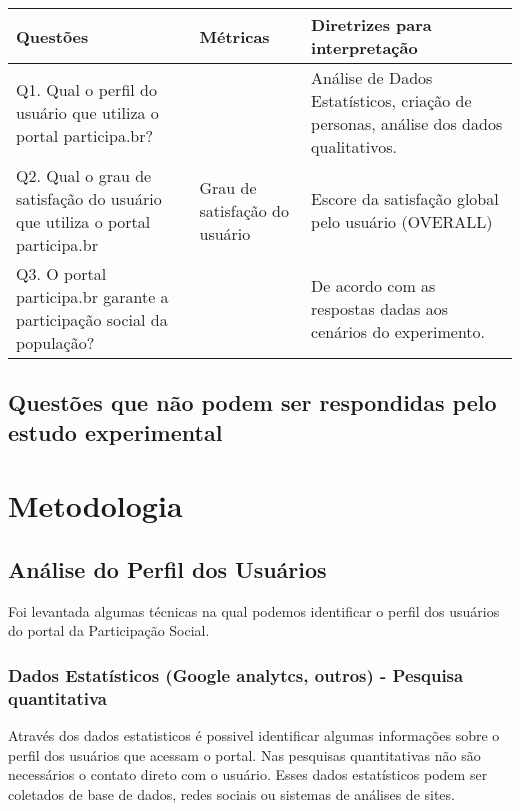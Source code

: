 \begin{table}[h]
\begin{tabular}{|l|l|l|}
\hline
\textbf{Questões}                                                          & Métricas                      & Diretrizes para interpretação                                                       \\ \hline
Q1. Qual o perfil do usuário que utiliza o portal participa.br?            &                               & Análise de Dados Estatísticos, criação de personas, análise dos dados qualitativos. \\ \hline
Q2. Qual o grau de satisfação do usuário que utiliza o portal participa.br & Grau de satisfação do usuário & Escore da satisfação global pelo usuário (OVERALL)                                  \\ \hline
Q3. O portal participa.br garante a participação social da população?      &                               & De acordo com as respostas dadas aos cenários do experimento.                       \\ \hline
\end{tabular}
\end{table}


\subsection{Questões que não podem ser respondidas pelo estudo experimental}

\section{Metodologia}

\subsection{Análise do Perfil dos Usuários}

	Foi levantada algumas técnicas na qual podemos identificar o perfil dos usuários do portal da Participação Social.

\subsubsection{Dados Estatísticos (Google analytcs, outros) - Pesquisa quantitativa}

	Através dos dados estatisticos é possivel identificar algumas informações sobre o perfil dos usuários que acessam o portal. Nas pesquisas quantitativas não são necessários o contato direto com o usuário. Esses dados estatísticos podem ser coletados de base de dados, redes sociais ou sistemas de análises de sites.

